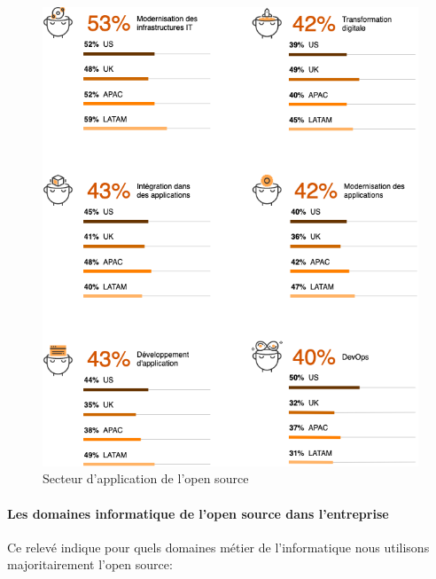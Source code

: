 					\begin{figure}[h]
						\center
						\includegraphics[scale=0.65]{./img/Use_os.png}
						\caption{Secteur d'application de l'open source}					
					\end{figure}
					\clearpage

				\paragraph{Les domaines informatique de l'open source dans l'entreprise\\}

					Ce relevé indique pour quels domaines métier de l'informatique nous utilisons majoritairement l'open source:

